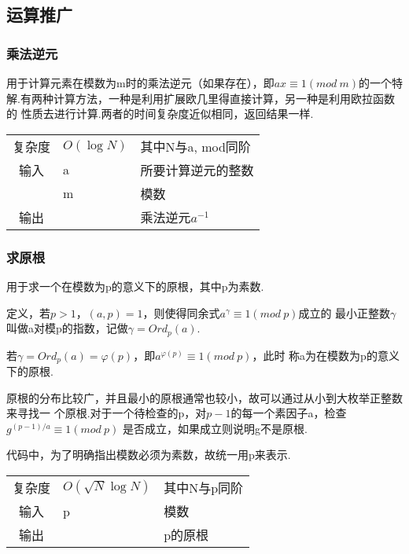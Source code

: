    \subsection{运算推广}\small


        \subsubsection{乘法逆元}\small
用于计算元素在模数为m时的乘法逆元（如果存在），即$ax \equiv 1(mod\ m)$的一个特
解.有两种计算方法，一种是利用扩展欧几里得直接计算，另一种是利用欧拉函数的
性质去进行计算.两者的时间复杂度近似相同，返回结果一样.
\begin{longtable}{|c|l|l|}
复杂度 & $O(\log N)$ & 其中N与a, mod同阶  \\
输入 & a & 所要计算逆元的整数 \\
 & m & 模数 \\
输出 &  & 乘法逆元$a^{-1}$ \\
\end{longtable}



        \subsubsection{求原根}\small
用于求一个在模数为p的意义下的原根，其中p为素数.

定义，若$p > 1$，$(a, p) = 1$，则使得同余式$a^{\gamma} \equiv 1(mod\ p)$成立的
最小正整数$\gamma$叫做a对模p的指数，记做$\gamma = Ord_{p}(a)$.

若$\gamma = Ord_{p}(a) = \varphi(p)$，即$a^{\varphi(p)} \equiv 1(mod\ p)$，此时
称a为在模数为p的意义下的原根.

原根的分布比较广，并且最小的原根通常也较小，故可以通过从小到大枚举正整数来寻找一
个原根.对于一个待检查的p，对$p - 1$的每一个素因子a，检查$g^{(p-1)/a} \equiv 1(mod\ p)$
是否成立，如果成立则说明g不是原根.

代码中，为了明确指出模数必须为素数，故统一用p来表示.
\begin{longtable}{|c|l|l|}
复杂度 & $O(\sqrt{N}\log N)$ & 其中N与p同阶  \\
输入 & p & 模数 \\
输出 &  & p的原根 \\
\end{longtable}



